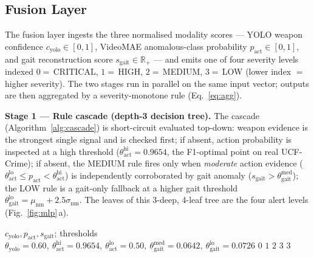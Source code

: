 \documentclass[runningheads]{llncs}
\begin{document}
\subsection{Fusion Layer}\label{sec:fusion}

The fusion layer ingests the three normalised modality scores --- YOLO weapon confidence $c_\text{yolo}\in[0,1]$, VideoMAE anomalous-class probability $p_\text{act}\in[0,1]$, and gait reconstruction score $s_\text{gait}\in\mathbb{R}_+$ --- and emits one of four severity levels indexed $0=$\,CRITICAL, $1=$\,HIGH, $2=$\,MEDIUM, $3=$\,LOW (lower index $=$ higher severity). The two stages run in parallel on the same input vector; outputs are then aggregated by a severity-monotone rule (Eq.~\ref{eq:agg}).

\textbf{Stage 1 --- Rule cascade (depth-3 decision tree).} The cascade (Algorithm~\ref{alg:cascade}) is short-circuit evaluated top-down: weapon evidence is the strongest single signal and is checked first; if absent, action probability is inspected at a high threshold ($\theta_\text{act}^\text{hi} = 0.9654$, the F1-optimal point on real UCF-Crime); if absent, the MEDIUM rule fires only when \emph{moderate} action evidence ($\theta_\text{act}^\text{lo} \leq p_\text{act} < \theta_\text{act}^\text{hi}$) is independently corroborated by gait anomaly ($s_\text{gait} > \theta_\text{gait}^\text{med}$); the LOW rule is a gait-only fallback at a higher gait threshold $\theta_\text{gait}^\text{lo} = \mu_\text{nm} + 2.5\sigma_\text{nm}$. The leaves of this 3-deep, 4-leaf tree are the four alert levels (Fig.~\ref{fig:mlp}\,a).

\begin{algorithm}[!htbp]
\caption{Rule cascade for stage-1 fusion.}\label{alg:cascade}
\begin{algorithmic}[1]
\Require $c_\text{yolo}, p_\text{act}, s_\text{gait}$; thresholds $\theta_\text{yolo}\!=\!0.60,\ \theta_\text{act}^\text{hi}\!=\!0.9654,\ \theta_\text{act}^\text{lo}\!=\!0.50,\ \theta_\text{gait}^\text{med}\!=\!0.0642,\ \theta_\text{gait}^\text{lo}\!=\!0.0726$
 \State \Return $0$ 
 \State \Return $1$ 
 \State \Return $2$ 
 \State \Return $3$ 
\Else \State \Return $3$ 
\EndIf
\end{algorithmic}
\end{algorithm}
\end{document}
